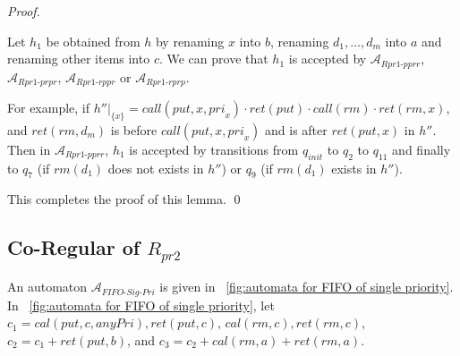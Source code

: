 \documentclass{llncs}
\begin{document}
\begin {proof}
\begin{itemize}
    Let $h_1$ be obtained from $h$ by renaming $x$ into $b$, renaming $d_1,\ldots,d_m$ into $a$ and renaming other items into $c$. We can prove that $h_1$ is accepted by $\mathcal{A}_{\textit{Rpr1-pprr}}$, $\mathcal{A}_{\textit{Rpr1-prpr}}$, $\mathcal{A}_{\textit{Rpr1-rppr}}$ or $\mathcal{A}_{\textit{Rpr1-rprp}}$.

    For example, if $h'' \vert_{ \{ x \} } = \textit{call}(\textit{put},x,\textit{pri}_x) \cdot \textit{ret}(\textit{put}) \cdot \textit{call}(\textit{rm}) \cdot \textit{ret}(\textit{rm},x)$, and $\textit{ret}(\textit{rm},d_m)$ is before $\textit{call}(\textit{put},x,\textit{pri}_x)$ and is after $\textit{ret}(\textit{put},x)$ in $h''$. Then in  $\mathcal{A}_{\textit{Rpr1-pprr}}$, $h_1$ is accepted by transitions from $q_{\textit{init}}$ to $q_2$ to $q_{11}$ and finally to $q_7$ (if $\textit{rm}(d_1)$ does not exists in $h''$) or $q_9$ (if $\textit{rm}(d_1)$ exists in $h''$).
\end{itemize}

This completes the proof of this lemma. \qed
\end {proof}




\subsection{Co-Regular of $R_{\textit{pr2}}$}
\label{subsec:co-regular of Rpr2}

An automaton $\mathcal{A}_{\textit{FIFO-Sig-Pri}}$ is given in \figurename~\ref{fig:automata for FIFO of single priority}. In \figurename~\ref{fig:automata for FIFO of single priority}, let $c_1= \textit{cal}(\textit{put},c,\textit{anyPri}),\textit{ret}(\textit{put},c)$, $\textit{cal}(\textit{rm},c),\textit{ret}(\textit{rm},c)$, $c_2 = c_1 + \textit{ret}(\textit{put},b)$, and $c_3 = c_2 + \textit{cal}(\textit{rm},a) + \textit{ret}(\textit{rm},a)$.
\end{document}
